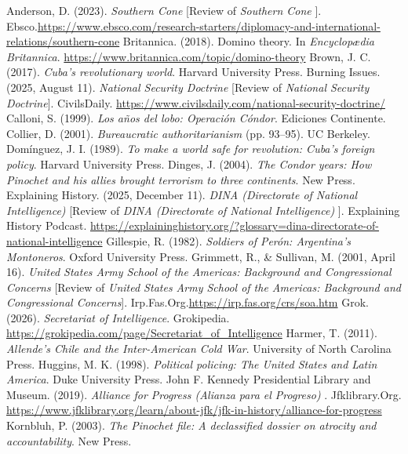 
\begin{referencelist}
   Anderson, D. (2023). \emph{Southern Cone} [Review of \emph{Southern Cone} ]. Ebsco.\url{https://www.ebsco.com/research-starters/diplomacy-and-international-relations/southern-cone}
   Britannica. (2018). Domino theory. In \emph{Encyclopædia Britannica}. \url{https://www.britannica.com/topic/domino-theory}
   Brown, J. C. (2017). \emph{Cuba's revolutionary world}. Harvard University Press.
   Burning Issues. (2025, August 11). \emph{National Security Doctrine} [Review of \emph{National Security Doctrine}]. CivilsDaily. \url{https://www.civilsdaily.com/national-security-doctrine/}
   Calloni, S. (1999). \emph{Los años del lobo: Operación Cóndor}. Ediciones Continente.
   Collier, D. (2001). \emph{Bureaucratic authoritarianism} (pp. 93–95). UC Berkeley.
   Domínguez, J. I. (1989). \emph{To make a world safe for revolution: Cuba's foreign policy}. Harvard University Press.
   Dinges, J. (2004). \emph{The Condor years: How Pinochet and his allies brought terrorism to three continents}. New Press.
   Explaining History. (2025, December 11). \emph{DINA (Directorate of National Intelligence)} [Review of \emph{DINA (Directorate of National Intelligence)} ]. Explaining History Podcast. \url{https://explaininghistory.org/?glossary=dina-directorate-of-national-intelligence}
   Gillespie, R. (1982). \emph{Soldiers of Perón: Argentina's Montoneros}. Oxford University Press.
   Grimmett, R., \& Sullivan, M. (2001, April 16). \emph{United States Army School of the Americas: Background and Congressional Concerns} [Review of \emph{United States Army School of the Americas: Background and Congressional Concerns}]. Irp.Fas.Org.\url{https://irp.fas.org/crs/soa.htm}
   Grok. (2026). \emph{Secretariat of Intelligence}. Grokipedia. \url{https://grokipedia.com/page/Secretariat_of_Intelligence}
   Harmer, T. (2011). \emph{Allende's Chile and the Inter-American Cold War}. University of North Carolina Press.
   Huggins, M. K. (1998). \emph{Political policing: The United States and Latin America}. Duke University Press.
   John F. Kennedy Presidential Library and Museum. (2019). \emph{Alliance for Progress (Alianza para el Progreso)} . Jfklibrary.Org. \url{https://www.jfklibrary.org/learn/about-jfk/jfk-in-history/alliance-for-progress}
   Kornbluh, P. (2003). \emph{The Pinochet file: A declassified dossier on atrocity and accountability}. New Press.

\end{referencelist}
